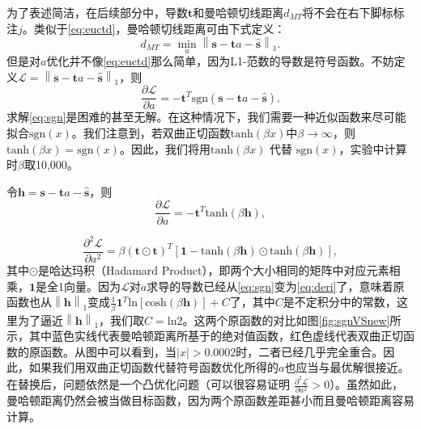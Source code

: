 为了表述简洁，在后续部分中，导数$\mathbf{t}$和曼哈顿切线距离$d_{MT}$将不会在右下脚标标注$j$。类似于\eqref{eq:euctd}，曼哈顿切线距离可由下式定义：
\begin{equation}
d_{MT} = \mathop {\min }\limits_{a} {\left\| \mathbf{s} - \mathbf{t}a - \widehat{\mathbf{s}} \right\|}_1. \label{eq:mantd}
\end{equation}
但是对$a$优化并不像\eqref{eq:euctd}那么简单，因为L1-范数的导数是符号函数。不妨定义$\mathcal{L} = {\left\| \mathbf{s} - \mathbf{t}a - \widehat{\mathbf{s}} \right\|}_1$，则
\begin{equation}
\frac{\partial \mathcal{L}}{\partial a} = -\mathbf{t}^T \mathrm{sgn}\left( \mathbf{s} - \mathbf{t}a - \widehat{\mathbf{s}} \right). \label{eq:sgn}
\end{equation}
求解\eqref{eq:sgn}是困难的甚至无解。在这种情况下，我们需要一种近似函数来尽可能拟合$\mathrm{sgn}(x)$。我们注意到，若双曲正切函数$\mathrm{tanh}(\beta x)$中$\beta \rightarrow \infty$，则$\mathrm{tanh}(\beta x) = \mathrm{sgn}(x)$。因此，我们将用$\mathrm{tanh}(\beta x)$ 代替 $\mathrm{sgn}(x)$，实验中计算时$\beta$取10,000。

令$\mathbf{h} = \mathbf{s} - \mathbf{t}a - \widehat{\mathbf{s}}$，则
\begin{equation}
\frac{\partial \mathcal{L}}{\partial a} = -\mathbf{t}^T \mathrm{tanh}\left( \beta \mathbf{h} \right), 
\label{eq:deri}
\end{equation}

\begin{equation}
\frac{{\partial}^2 \mathcal{L}}{\partial a^2} = \beta \left( \mathbf{t} \odot \mathbf{t} \right )^T \left[ \mathbf{1} - \mathrm{tanh}\left( \beta \mathbf{h} \right) \odot \mathrm{tanh}\left( \beta \mathbf{h} \right) \right], 
\label{eq:hessian}
\end{equation}
其中$\odot$是哈达玛积（Hadamard Product），即两个大小相同的矩阵中对应元素相乘，$\mathbf{1}$是全1向量。因为$\mathcal{L}$对$a$求导的导数已经从\eqref{eq:sgn}变为\eqref{eq:deri}了，意味着原函数也从${\left\| \mathbf{h} \right\|}_1$变成$\frac{1}{\beta}\mathbf{1}^T\mathrm{ln}\left[ \mathrm{cosh} \left( \beta \mathbf{h} \right) \right] + C$了，其中$C$是不定积分中的常数，这里为了逼近${\left\| \mathbf{h} \right\|}_1$，我们取$C=\mathrm{ln}2$。这两个原函数的对比如图\ref{fig:sgnVSnew}所示，其中蓝色实线代表曼哈顿距离所基于的绝对值函数，红色虚线代表双曲正切函数的原函数。从图中可以看到，当$|x|>0.0002$时，二者已经几乎完全重合。因此，如果我们用双曲正切函数代替符号函数优化所得的$a$也应当与最优解很接近。在替换后，问题依然是一个凸优化问题（可以很容易证明 $\frac{{\partial}^2 \mathcal{L}}{\partial a^2} > 0$）。虽然如此，曼哈顿距离仍然会被当做目标函数，因为两个原函数差距甚小而且曼哈顿距离容易计算。

